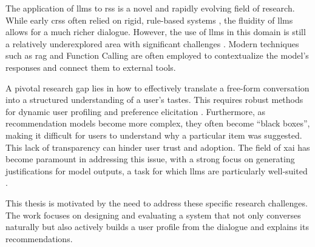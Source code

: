 The application of \acp{llm} to \aclp{rs} is a novel and rapidly evolving field of research. While early \acp{crs} often relied on rigid, rule-based systems \cite{SOTA-CRS}, the fluidity of \acp{llm} allows for a much richer dialogue. However, the use of \acp{llm} in this domain is still a relatively underexplored area with significant challenges \cite{SOTA-CRS-LLM, BOOK:RS-HANDBOOK}. Modern techniques such as \ac{rag} and Function Calling are often employed to contextualize the model's responses and connect them to external tools.

A pivotal research gap lies in how to effectively translate a free-form conversation into a structured understanding of a user's tastes. This requires robust methods for dynamic user profiling and preference elicitation \cite[Conversational Preference Elicitation]{CHAPTER:RS-HANDBOOK-NLP}. Furthermore, as recommendation models become more complex, they often become ``black boxes'', making it difficult for users to understand why a particular item was suggested. This lack of transparency can hinder user trust and adoption. The field of \ac{xai} has become paramount in addressing this issue, with a strong focus on generating justifications for model outputs, a task for which \acp{llm} are particularly well-suited \cite[Generating Textual Explanations]{CHAPTER:RS-HANDBOOK-NLP, SOTA-RECSYS-EXPLAIN}.

This thesis is motivated by the need to address these specific research challenges. The work focuses on designing and evaluating a system that not only converses naturally but also actively builds a user profile from the dialogue and explains its recommendations.